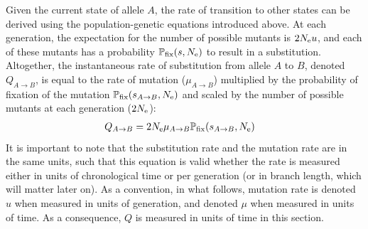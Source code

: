 \begin{table}[H]
    \centering
    \noindent{}
    \caption[Parameters of mutation-selection processes]{Parameter of mutation-selection processes used in this section (\ref{subsec:mutation-limited-assumption})}
    \label{table:params-mutsel}
\end{table}

Given the current state of \gls{allele} $A$, the rate of transition to other states can be derived using the population-genetic equations introduced above.
At each generation, the expectation for the number of possible mutants is $2N_{\text{e}} u$, and each of these mutants has a probability $\mathbb{P}_{\text{fix}}(s, N_{\text{e}})$ to result in a \gls{substitution}.
Altogether, the instantaneous rate of \gls{substitution} from \gls{allele} $A$ to $B$, denoted $Q_{A \to B}$, is equal to the rate of mutation ($\mu_{A \to B}$) multiplied by the probability of fixation of the mutation $\mathbb{P}_{\text{fix}}(s_{A \to B}, N_{\text{e}})$ and scaled by the number of possible mutants at each generation ($2N_{\text{e}}$):
\begin{align}
    Q_{A \to B} & = 2 N_{\text{e}} \mu_{A \to B}  \mathbb{P}_{\text{fix}}(s_{A \to B}, N_{\text{e}}) \label{eq:q-pfix}
\end{align}
It is important to note that the \gls{substitution} rate and the mutation rate are in the same units, such that this equation is valid whether the rate is measured either in units of chronological time or per generation (or in branch length, which will matter later on).
As a convention, in what follows, mutation rate is denoted $u$ when measured in units of generation, and denoted $\mu$ when measured in units of time.
As a consequence, $Q$ is measured in units of time in this section.

